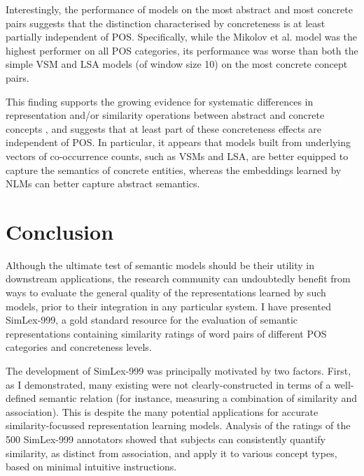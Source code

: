 Interestingly, the performance of models on the most abstract and most concrete pairs suggests that the distinction characterised by concreteness is at least partially independent of POS. Specifically, while the Mikolov et al. model was the highest performer on all POS categories, its performance was worse than both the simple VSM and LSA models (of window size 10) on the most concrete concept pairs.

This finding supports the growing evidence for systematic differences in representation and/or similarity operations between abstract and concrete concepts \citep{hill2013concreteness}, and suggests that at least part of these concreteness effects are independent of POS. In particular, it appears that models built from underlying vectors of co-occurrence counts, such as VSMs and LSA, are better equipped to capture the semantics of concrete entities, whereas the embeddings learned by NLMs can better capture abstract semantics. 

\section{Conclusion} 
\label{conclusion}
Although the ultimate test of semantic models should be their utility in downstream applications, the research community can undoubtedly benefit from ways to evaluate the general quality of the representations learned by such models, prior to their integration in any particular system. I have presented SimLex-999, a gold standard resource for the evaluation of semantic representations containing similarity ratings of word pairs of different POS categories and concreteness levels. 

The development of SimLex-999 was principally motivated by two factors. First, as I demonstrated, many existing were not clearly-constructed in terms of a well-defined semantic relation (for instance, measuring a combination of similarity and association). This is despite the many potential applications for accurate similarity-focussed representation learning models. Analysis of the ratings of the 500 SimLex-999 annotators showed that subjects can consistently quantify similarity, as distinct from association, and apply it to various concept types, based on minimal intuitive instructions. 

